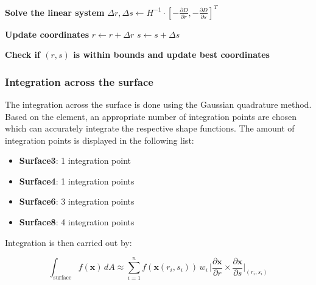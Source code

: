 \begin{algorithm}[H]
{{        \textbf{Solve the linear system} \;
        $\Delta r, \Delta s \gets H^{-1} \cdot \left[ - \frac{\partial D}{\partial r}, - \frac{\partial D}{\partial s} \right]^T$ \;

        \textbf{Update coordinates} \;
        $r \gets r + \Delta r$ \;
        $s \gets s + \Delta s$ \;

    }
    \textbf{Check if $(r, s)$ is within bounds and update best coordinates} \;
}
 \;
\end{algorithm}

\subsubsection{Integration across the surface}
The integration across the surface is done using the Gaussian quadrature method.
Based on the element, an appropriate number of integration points are chosen which can accurately integrate the respective shape functions.
The amount of integration points is displayed in the following list:

\begin{itemize}
    \item \textbf{Surface3}: 1 integration point
    \item \textbf{Surface4}: 1 integration points
    \item \textbf{Surface6}: 3 integration points
    \item \textbf{Surface8}: 4 integration points
\end{itemize}

Integration is then carried out by:

\[
\int_{\text{surface}} f(\mathbf{x}) \, dA \approx \sum_{i=1}^{n} f(\mathbf{x}(r_i, s_i)) \, w_i \, \bigg| \frac{\partial \mathbf{x}}{\partial r} \times \frac{\partial \mathbf{x}}{\partial s} \bigg|_{(r_i, s_i)}
\]

